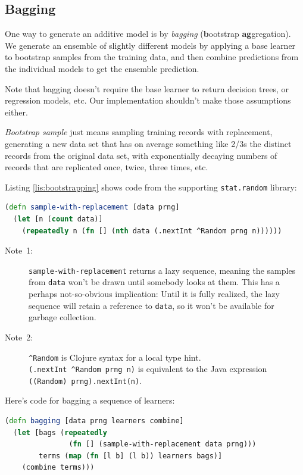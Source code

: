 \documentclass[10pt,openany]{article}
\numberwithin{definition}{section}
\numberwithin{example}{section}
\numberwithin{equation}{section}
\numberwithin{figure}{section}
\begin{document}
\subsection{\label{sub:Bagging}Bagging}

One way to generate an additive model is by \emph{bagging} (\textbf{b}ootstrap
\textbf{ag}gregation). We generate an ensemble of slightly different
models by applying a base learner to bootstrap samples from the training
data, and then combine predictions from the individual models to get
the ensemble prediction.

Note that bagging doesn't require the base learner to return decision
trees, or regression models, etc. Our implementation shouldn't make
those assumptions either.

\emph{Bootstrap sample} just means sampling training records with
replacement, generating a new data set that has on average something
like 2/3s the distinct records from the original data set, with exponentially
decaying numbers of records that are replicated once, twice, three
times, etc. 

Listing \ref{lis:bootstrapping} shows code from the supporting
\texttt{stat.random} library:

\begin{minipage}[t]{1\columnwidth}%
\begin{lstlisting}[caption={Bootstrapping},label={lis:bootstrapping},language=clojure,tabsize=2]
(defn sample-with-replacement [data prng]
  (let [n (count data)]
    (repeatedly n (fn [] (nth data (.nextInt ^Random prng n))))))
\end{lstlisting}
%
\end{minipage}
\begin{description}
\item [{Note~1:}] \texttt{sample-with-replacement} returns a lazy sequence,
meaning the samples from \texttt{data} won't be drawn until somebody
looks at them. This has a perhaps not-so-obvious implication: Until
it is fully realized, the lazy sequence will retain a reference to
\texttt{data}, so it won't be available for garbage collection.
\item [{Note~2:}] \texttt{\textasciicircum{}Random} is Clojure syntax
for a local type hint. \texttt{(.nextInt~\textasciicircum{}Random~prng~n)}
is equivalent to the Java expression \texttt{((Random)~prng).nextInt(n)}. 
\end{description}
Here's code for bagging a sequence of learners:

\begin{lstlisting}[caption={Bagging},label={lis:bagging},language=clojure,tabsize=2]
(defn bagging [data prng learners combine]
  (let [bags (repeatedly 
               (fn [] (sample-with-replacement data prng)))
        terms (map (fn [l b] (l b)) learners bags)]
    (combine terms))) 
\end{lstlisting}
\end{document}
